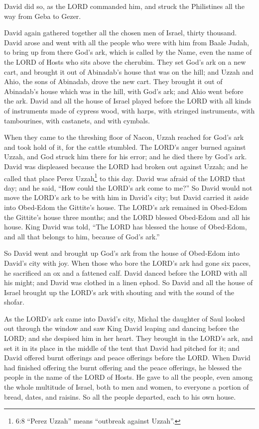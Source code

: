 \myverse{}David did so, as the LORD commanded him, and struck the Philistines
all the way from Geba to Gezer.


\mychapter{} \myverse*{}David again gathered together all the chosen men of Israel, thirty
thousand.
\myverse{}David arose and went with all the people who were with him from Baale Judah,
to bring up from there God’s ark, which is called by the Name, even the name of the LORD of Hosts who
sits above the cherubim.
\myverse{}They set God’s ark on a new cart, and brought it out of Abinadab’s house that
was on the hill; and Uzzah and Ahio, the sons of Abinadab, drove the new cart.
\myverse{}They brought it out of Abinadab’s house which was in the hill, with God’s ark;
and Ahio went before the ark.
\myverse{}David and all the house of Israel played before the LORD with all kinds of instruments
made of cypress wood, with harps, with stringed instruments, with tambourines, with castanets, and with
cymbals.

\myverse{}When they came to the threshing floor of Nacon, Uzzah reached for
God’s ark and took hold of it, for the cattle stumbled.
\myverse{}The LORD’s anger burned against Uzzah, and God struck him there for his error;
and he died there by God’s ark.
\myverse{}David was displeased because the LORD had broken out against Uzzah; and he called
that place Perez Uzzah\footnote{6:8 “Perez Uzzah” means “outbreak against Uzzah”.} to this day.
\myverse{}David was afraid of the LORD that day; and he said, “How could the LORD’s ark
come to me?”
\myverse{}So David would not move the LORD’s ark to be with him in David’s city; but
David carried it aside into Obed-Edom the Gittite’s house.
\myverse{}The LORD’s ark remained in Obed-Edom the Gittite’s house three months; and
the LORD blessed Obed-Edom and all his house.
\myverse{}King David was told, “The LORD has blessed the house of Obed-Edom, and all
that belongs to him, because of God’s ark.”

So David went and brought up God’s ark from the house of Obed-Edom into David’s city with
joy.
\myverse{}When those who bore the LORD’s ark had gone six paces, he sacrificed an ox
and a fattened calf.
\myverse{}David danced before the LORD with all his might; and David was clothed in
a linen ephod.
\myverse{}So David and all the house of Israel brought up the LORD’s ark with shouting
and with the sound of the shofar.

\myverse{}As the LORD’s ark came into David’s city, Michal the daughter
of Saul looked out through the window and saw King David leaping and dancing before the LORD; and she
despised him in her heart.
\myverse{}They brought in the LORD’s ark, and set it in its place in the middle of the
tent that David had pitched for it; and David offered burnt offerings and peace offerings before the LORD.
\myverse{}When David had finished offering the burnt offering and the peace offerings,
he blessed the people in the name of the LORD of Hosts.
\myverse{}He gave to all the people, even among the whole multitude of Israel, both
to men and women, to everyone a portion of bread, dates, and raisins. So all the people departed, each
to his own house.

